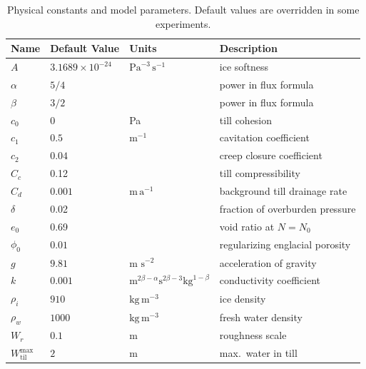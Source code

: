 \documentclass[gmd]{copernicus}   %
\newcommand{\text}{\textrm}
\newcommand{\Wtilmax}{W_{\text{til}}^{\text{max}}}
\begin{document}
\begin{table}[ht]
  \centering
  \caption{Physical constants and model parameters.  Default values are overridden in some experiments.}
  \begin{tabular}{lllp{3.0in}} 
    \textbf{Name} & \textbf{Default Value} & \textbf{Units} & \textbf{Description}\\
\hline
    $A$ & $3.1689\times 10^{-24}$ & $\text{Pa}^{-3}\,\text{s}^{-1}$ & ice softness \citep{EISMINT96} \phantom{$\Big|$} \\
    $\alpha$ & $5/4$ & & power in flux formula  \citep{Schoofetal2012} \\
    $\beta$ & $3/2$ & & power in flux formula  \citep{Schoofetal2012} \\
    $c_0$ & 0 & Pa & till cohesion \citep{Tulaczyketal2000} \\
    $c_1$ & $0.5$ & $\text{m}^{-1}$ & cavitation coefficient \citep{Schoofetal2012} \\
    $c_2$ & $0.04$ & & creep closure coefficient \\
    $C_c$ & 0.12 &  & till compressibility \citep{Tulaczyketal2000} \\
    $C_d$ & $0.001$ &  $\text{m}\,\text{a}^{-1}$ & background till drainage rate \\
    $\delta$ & 0.02 &  & fraction of overburden pressure \\
    $e_0$ & 0.69 &  & void ratio at $N=N_0$ \citep{Tulaczyketal2000} \\
    $\phi_0$ & $0.01$ & & regularizing englacial porosity \\
    $g$ & $9.81$ & m $\text{s}^{-2}$ & acceleration of gravity \\
    $k$ & $0.001$ & $\text{m}^{2\beta-\alpha} \text{s}^{2\beta-3} \text{kg}^{1-\beta}$ & conductivity coefficient \citep{Schoofetal2012} \\
    $\rho_i$ & $910$ & $\text{kg}\,\text{m}^{-3}$ & ice density \citep{GreveBlatter2009} \\
    $\rho_w$ & $1000$ & $\text{kg}\,\text{m}^{-3}$ & fresh water density \citep{GreveBlatter2009} \\
    $W_r$ & $0.1$ & $\text{m}$ & roughness scale \citep{Hewittetal2012} \\
    $\Wtilmax$ & $2\phantom{\Big|}$ & $\text{m}$ & max.~water in till \citep{BBssasliding} \\
    \hline
  \end{tabular}
 \label{tab:constants}
\end{table}
\end{document}
